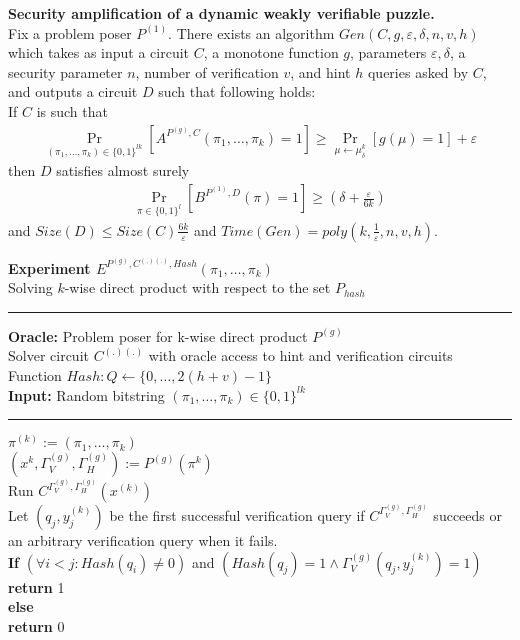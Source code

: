%
%
\begin{theorem}{\textbf{Security amplification of a dynamic weakly verifiable puzzle.}}\\
  Fix a problem poser $P^{(1)}$.
  There exists an algorithm $Gen(C, g, \varepsilon, \delta, n, v, h)$ which takes as input a circuit $C$, a monotone function $g$, parameters
  $\varepsilon, \delta$, a security parameter $n$, number of verification $v$, and hint $h$ queries asked by $C$, and outputs a circuit $D$
  such that following holds: \\
  If $C$ is such that \\
  \begin{align*}
    \underset{(\pi_1, \dots, \pi_k) \in \{0,1\}^{lk}}{\Pr}[A^{P^{(g)}, C}(\pi_1, \dots, \pi_k) = 1] \geq \underset{\mu \leftarrow \mu_\delta^k}{\Pr}[g(\mu) = 1] + \varepsilon
  \end{align*}
  then $D$ satisfies almost surely
  \begin{align*}
    \underset{\pi \in \{0,1\}^{l}}{\Pr}[B^{P^{(1)},D}(\pi) = 1] \geq (\delta + \frac{\varepsilon}{6k})
  \end{align*}
  and $Size(D) \leq Size(C)\frac{6k}{\varepsilon}$ and $Time(Gen) = poly(k, \frac{1}{\varepsilon}, n, v, h)$.
\end{theorem}
%
%
%
%
\begin{codeblock}
  \textbf{Experiment $E^{P^{(g)}, C^{(.)(.)}, Hash}(\pi_1, \dots, \pi_k)$} \\
  Solving $k$-wise direct product with respect to the set $P_{hash}$
  \medskip

  \hrule

  \medskip
  \textbf{Oracle:} Problem poser for k-wise direct product $P^{(g)}$ \\
  \IndI Solver circuit $C^{(.)(.)}$ with oracle access to hint and verification circuits \\
  \IndI Function $Hash: Q \leftarrow \{0, \dots, 2(h+v) - 1\}$\\
  \textbf{Input:} Random bitstring $(\pi_1, \dots, \pi_k) \in \{0,1\}^{lk}$\\

  \medskip\hrule\medskip

  $\pi^{(k)} := \left(\pi_1, \dots, \pi_k \right)$\\
  $(x^{k}, \Gamma_V^{(g)}, \Gamma_H^{(g)}) := P^{(g)}(\pi^{k})$\\
  Run $C^{\Gamma_V^{(g)}, \Gamma_H^{(g)}} (x^{(k)})$ \\
  \IndI Let $(q_j,y_j^{(k)})$ be the first successful verification query if $C^{\Gamma_V^{(g)}, \Gamma_H^{(g)}}$ succeeds or \\
  \IndI an arbitrary verification query when it fails.\\

  \textbf{If} $(\forall i < j :  Hash(q_i) \neq 0 )$ and $( Hash(q_j) = 1 \land \Gamma_V^{(g)}(q_j, y_j^{(k)}) = 1)$ \\
  \IndI \textbf{return} 1\\
  \textbf{else}\\
  \IndI \textbf{return} 0\\
\end{codeblock}
